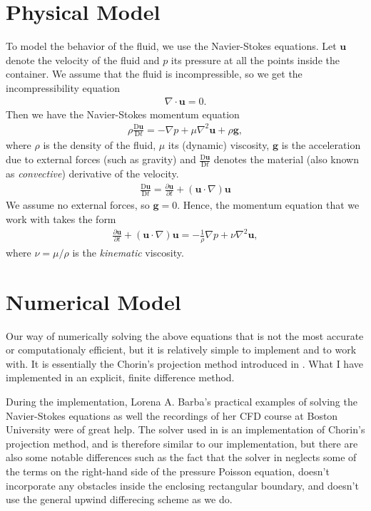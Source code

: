 \documentclass[11pt,a4paper,twoside,openright]{report}
\begin{document}
\section{Physical Model}
To model the behavior of the fluid, we use the Navier-Stokes equations. Let $\mathbf u$ denote the velocity of the fluid and $p$ its pressure at all the points inside the container. We assume that the fluid is incompressible, so we get the incompressibility equation
\newcommand{\uu}{\mathbf u}
\newcommand{\D}{\mathrm D}
\begin{align}\label{eq:incom}
	\nabla\cdot\uu=0.
\end{align}
Then we have the Navier-Stokes momentum equation
\newcommand{\conv}{\frac{\D\uu}{\D t}}
\begin{align*}
	\rho\conv=-\nabla p+\mu\nabla^2\uu+\rho\mathbf g,
\end{align*}
where $\rho$ is the density of the fluid, $\mu$ its (dynamic) viscosity, $\mathbf g$ is the acceleration due to external forces (such as gravity) and $\conv$ denotes the material (also known as \emph{convective}) derivative of the velocity.
\newcommand{\pder}[2]{\frac{\partial #1}{\partial #2}}
\begin{align*}
	\conv=\pder\uu t+(\uu\cdot\nabla)\uu
\end{align*}
We assume no external forces, so $\mathbf g=0$. Hence, the momentum equation that we work with takes the form
\begin{align}\label{eq:momentum}
	\pder\uu t+(\uu\cdot\nabla)\uu=-\frac1\rho\nabla p+\nu\nabla^2\uu,
\end{align}
where $\nu=\mu/\rho$ is the \emph{kinematic} viscosity.
\section{Numerical Model}
Our way of numerically solving the above equations that is not the most accurate or computationaly efficient, but it is relatively simple to implement and to work with. It is essentially the Chorin's projection method introduced in \cite{Chorin}. What I have implemented in an explicit, finite difference method.

During the implementation, Lorena A. Barba's practical examples of solving the Navier-Stokes equations \cite{CFDpython} as well the recordings of her CFD course at Boston University \cite{BarbaCourse} were of great help. The solver used in \cite{CFDpython} is an implementation of Chorin's projection method, and is therefore similar to our implementation, but there are also some notable differences such as the fact that the solver in \cite{CFDpython} neglects some of the terms on the right-hand side of the pressure Poisson equation, doesn't incorporate any obstacles inside the enclosing rectangular boundary, and doesn't use the general upwind differecing scheme as we do.
\end{document}
